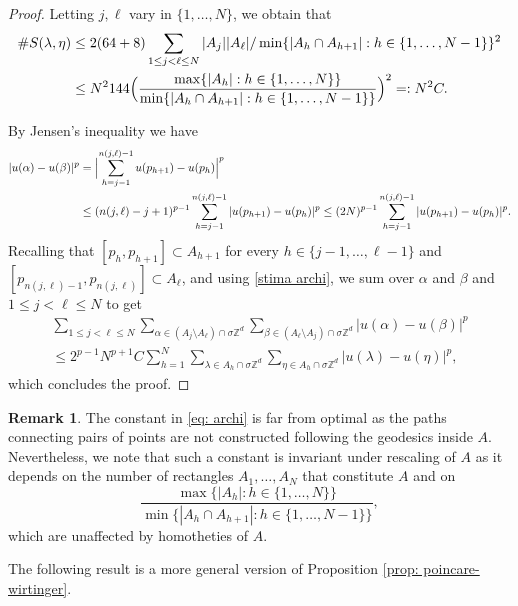 \documentclass{article}
\theoremstyle{plain}
\theoremstyle{definition}
\newtheorem{remark}[theorem]{Remark}
\def\ZZ{{\mathbb Z}}
\newcommand{\s}{\sigma}
\numberwithin{equation}{section}
\begin{document}
\begin{proof}
Letting $j,\ell$ vary in $\{1,\dots, N\}$, we obtain that
\begin{align} \notag
    \#S(\lambda,\eta) & \leq 2(64+8) \sum_{1\leq j<\ell\leq N} |A_j||A_\ell|/\min\{|A_h\cap A_{h+1}| :  h\in\{1,\dots, N-1\}\}^2 \\ \label{stima archi}
    & \leq N^2 144 \Bigl(\frac{\max\{|A_h|: h\in\{1,\dots, N\}\}}{\min\{|A_h\cap A_{h+1}| :  h\in\{1,\dots, N-1\}\}}\Bigr)^2=:N^2C.
\end{align}

By Jensen's inequality we have 
\begin{align*}
    |u(\alpha)-u(\beta)|^p &= \Bigl|\sum_{h=j-1}^{n(j,\ell)-1}u(p_{h+1})-u(p_h)\Bigr|^p \\
    &\leq (n(j,\ell)-j+1)^{p-1} \sum_{h=j-1}^{n(j,\ell)-1}|u(p_{h+1})-u(p_h)|^p \leq (2N)^{p-1}\sum_{h=j-1}^{n(j,\ell)-1}|u(p_{h+1})-u(p_h)|^p.
\end{align*}
Recalling that $[p_h,p_{h+1}]\subset A_{h+1}$ for every $h\in\{j-1,\dots, \ell-1\}$ and $[p_{n(j,\ell)-1},p_{n(j,\ell)}]\subset A_\ell$, and using \eqref{stima archi}, we sum over $\alpha$ and $\beta$ and $1\leq j<\ell\leq N$ to get 
\begin{multline*}
     \sum_{1\leq j<\ell\leq N}\sum_{\alpha\in (A_j\setminus A_\ell) \cap\s\ZZ^d}\sum_{\beta \in (A_\ell\setminus A_j)\cap\s\ZZ^d}|u(\alpha)-u(\beta)|^p \\ \leq 2^{p-1}N^{p+1}C \sum_{h=1}^{N}\sum_{\lambda\in A_h\cap \s \ZZ^d}\sum_{\eta\in A_h\cap \s \ZZ^d}|u(\lambda)-u(\eta)|^p,
\end{multline*}
which concludes the proof.
\end{proof}

\begin{remark}
    The constant in \eqref{eq: archi} is far from optimal as the paths connecting pairs of points are not constructed following the geodesics inside $A$. Nevertheless, we note that such a constant is invariant under rescaling of $A$ as it depends on the number of rectangles $A_1,\dots,A_N$ that constitute $A$ and on
    \begin{equation*}
        \frac{\max\{|A_h|: h\in\{1,\dots, N\}\}}{\min\{|A_h\cap A_{h+1}| :  h\in\{1,\dots, N-1\}\}},
    \end{equation*}
    which are unaffected by homotheties of $A$.
\end{remark}

The following result is a more general version of Proposition \ref{prop: poincare-wirtinger}.
\end{document}

